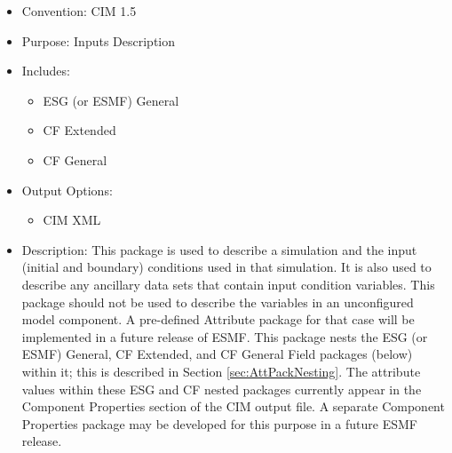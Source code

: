 \begin{itemize}
    \item Convention: CIM 1.5
    \item Purpose: Inputs Description
    \item Includes: 
    \begin{itemize}
        \item ESG (or ESMF) General
        \item CF Extended
        \item CF General
    \end{itemize}
    \item Output Options:
    \begin{itemize}
        \item CIM XML 
    \end{itemize}
    \item Description: This package is used to describe a simulation and the input (initial and boundary) conditions used in that simulation. It is also used to describe any ancillary data sets that contain input condition variables. This package should not be used to describe the variables in an unconfigured model component. A pre-defined Attribute package for that case will be implemented in a future release of ESMF.  This package nests the ESG (or ESMF) General, CF Extended, and CF General Field packages (below) within it; this is described in Section \ref{sec:AttPackNesting}.  The attribute values within these ESG and CF nested packages currently appear in the Component Properties section of the CIM output file.  A separate Component Properties package may be developed for this purpose in a future ESMF release.
\end{itemize}

